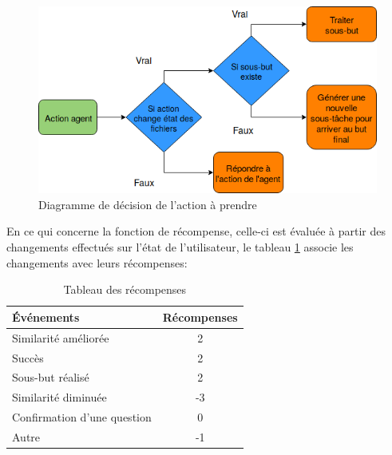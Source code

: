 \begin{figure}[H] 
	\centering
	\includegraphics[width=0.6\linewidth]{images/Conception/DM/action_diag.png}
	\caption{Diagramme de décision de l'action à prendre}\label{action_diag}
	
\end{figure}
En ce qui concerne la fonction de récompense, celle-ci est évaluée à partir des changements effectués sur l'état de l'utilisateur, le tableau \ref{table_reward} associe les changements avec leurs récompenses:
\begin{table}[H]
	\begin{center}
		
		\begin{tabular}{|l|c|} %
			\hline
			\textbf{Événements} & \textbf{Récompenses}\\
			\hline
			Similarité améliorée & 2\\
			\hline
			Succès & 2\\
			\hline
			Sous-but réalisé & 2\\
			\hline
			Similarité diminuée & -3\\
			\hline
			Confirmation d'une question & 0\\
			\hline
			Autre & -1\\
			\hline
		\end{tabular}
		\caption{Tableau des récompenses}\label{table_reward}
	\end{center}
\end{table}
